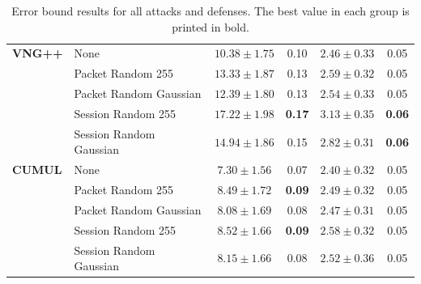 \documentclass[
	ruledheaders=chapter,
	class=report,
	thesis={type=master, department=inf},
	accentcolor=1c,
	custommargins=true,
	marginpar=false,
	parskip=half-,
	fontsize=11pt,
]{tudapub}
\begin{document}
\begin{table}
\begin{tabular}{llcccc}
			\textbf{VNG++} & None & $10.38 \pm 1.75$ & 0.10 & $2.46 \pm 0.33$ & 0.05 \\
			 & Packet Random 255 & $13.33\pm 1.87$ & 0.13 & $2.59 \pm 0.32$ & 0.05 \\
			 & Packet Random Gaussian & $12.39 \pm 1.80$ & 0.13 & $2.54 \pm 0.33$ & 0.05 \\
			 & Session Random 255 & $\mathbf{17.22 \pm 1.98}$ & \textbf{0.17} & $\mathbf{3.13 \pm 0.35}$ & \textbf{0.06} \\
			 & Session Random Gaussian & $14.94\pm 1.86$ & 0.15 & $2.82 \pm 0.31$ & \textbf{0.06} \\ \addlinespace
			 
			\textbf{CUMUL} & None & $7.30 \pm 1.56$  & 0.07 & $2.40\pm 0.32$ & 0.05 \\
			 & Packet Random 255 & $8.49 \pm 1.72$ & \textbf{0.09} & $2.49 \pm 0.32$ & 0.05 \\
			 & Packet Random Gaussian & $8.08 \pm 1.69$ & 0.08 & $2.47\pm 0.31$ & 0.05 \\
			 & Session Random 255 & $\mathbf{8.52 \pm 1.66}$ & \textbf{0.09} & $\mathbf{2.58 \pm 0.32}$ & 0.05 \\
			 & Session Random Gaussian & $8.15 \pm 1.66$ & 0.08 & $2.52\pm 0.36$ & 0.05 \\
			\bottomrule
		\end{tabular}
		\caption{Error bound results for all attacks and defenses. The best value in each group is printed in bold.}
		\label{tbl:error_bound}
	\end{table}
\end{document}
